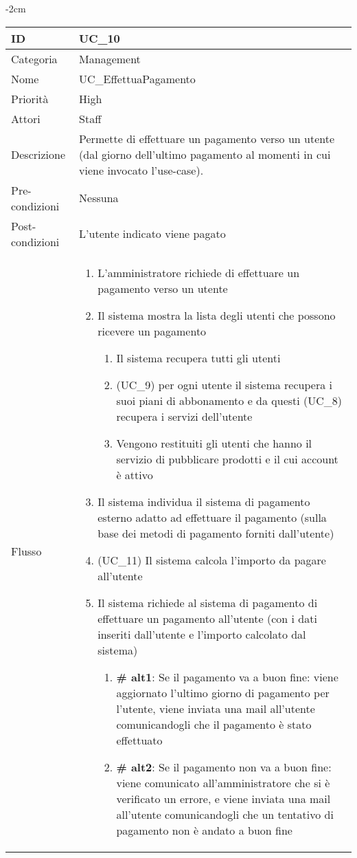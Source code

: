 \begin{center}
\begin{table}[bp]
    \centering
    \addtolength{\leftskip} {-2cm}
\begin{tabular}{ |p{2.6cm}|p{13cm}|  }
\hline
ID & UC\_10 \\\hline
Categoria & Management\\\hline
Nome & UC\_EffettuaPagamento\\\hline
Priorità & High \\\hline
Attori &  Staff \\\hline
Descrizione & Permette di effettuare un pagamento verso un utente (dal giorno dell'ultimo pagamento al momenti in cui viene invocato l'use-case).\\\hline
Pre-condizioni &  Nessuna\\\hline
Post-condizioni &  L'utente indicato viene pagato\\\hline
Flusso &  	
		\begin{enumerate}	
		\item L'amministratore richiede di effettuare un pagamento verso un utente
		\item Il sistema mostra la lista degli utenti che possono ricevere un pagamento
			\begin{enumerate}[  ]
			\item Il sistema recupera tutti gli utenti
			\item (UC\_9) per ogni utente il sistema recupera i suoi piani di abbonamento e da questi (UC\_8) recupera i servizi dell'utente
			\item Vengono restituiti gli utenti che hanno il servizio di pubblicare prodotti e il cui account è attivo
			\end{enumerate}
		\item Il sistema individua il sistema di pagamento esterno adatto ad effettuare il pagamento (sulla base dei metodi di pagamento forniti dall'utente)
		\item (UC\_11) Il sistema calcola l'importo da pagare all'utente
		\item Il sistema richiede al sistema di pagamento di effettuare un pagamento all'utente (con i dati inseriti dall'utente e l'importo calcolato dal sistema)
			\begin{enumerate}[  ]
			\item \textbf{\# alt1}: Se il pagamento va a buon fine: viene aggiornato l'ultimo giorno di pagamento per l'utente, viene inviata una mail all'utente comunicandogli che il pagamento è stato effettuato
			\item \textbf{\# alt2}: Se il pagamento non va a buon fine: viene comunicato all'amministratore che si è verificato un errore, e viene inviata una mail all'utente comunicandogli che un tentativo di pagamento non è andato a buon fine
			\end{enumerate}
		\end{enumerate}\\\hline
\end{tabular}
\label{table_use_case:10}\newline
\end{table}


\end{center}
